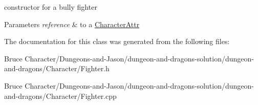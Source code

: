 constructor for a bully fighter 
\begin{DoxyParams}{Parameters}
{\em reference} & to a \hyperlink{class_character_attr}{Character\+Attr} \\
\hline
\end{DoxyParams}


The documentation for this class was generated from the following files\+:\begin{DoxyCompactItemize}
\item 
Bruce Character/\+Dungeons-\/and-\/\+Jason/dungeon-\/and-\/dragons-\/solution/dungeon-\/and-\/dragons/\+Character/Fighter.\+h\item 
Bruce Character/\+Dungeons-\/and-\/\+Jason/dungeon-\/and-\/dragons-\/solution/dungeon-\/and-\/dragons/\+Character/Fighter.\+cpp\end{DoxyCompactItemize}
